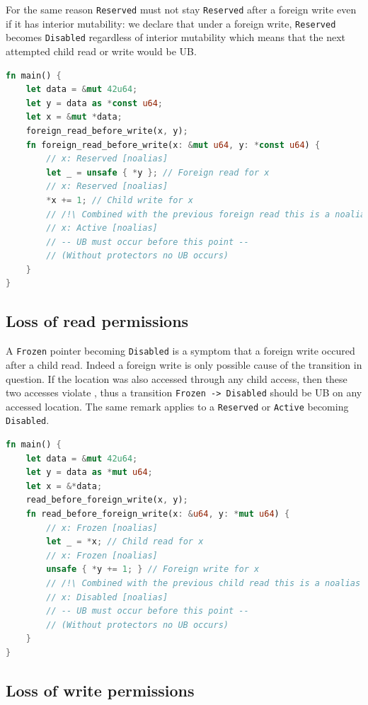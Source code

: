\documentclass[a4paper,11pt]{article}
\theoremstyle{plain}
\theoremstyle{definition}
\theoremstyle{remark}
\newcommand{\tcode}[1]{\rstinline{#1}}
\newcommand{\tperm}[1]{\texttt{#1}}
\begin{document}
For the same reason \tperm{Reserved} must not stay \tperm{Reserved} after a foreign write even
if it has interior mutability: we declare that under a foreign write, \tperm{Reserved} becomes
\tperm{Disabled} regardless of interior mutability which means that the next attempted child read or write would be UB.

\begin{lstlisting}[language=rust]
fn main() {
    let data = &mut 42u64;
    let y = data as *const u64;
    let x = &mut *data;
    foreign_read_before_write(x, y);
    fn foreign_read_before_write(x: &mut u64, y: *const u64) {
        // x: Reserved [noalias]
        let _ = unsafe { *y }; // Foreign read for x
        // x: Reserved [noalias]
        *x += 1; // Child write for x
        // /!\ Combined with the previous foreign read this is a noalias violation
        // x: Active [noalias]
        // -- UB must occur before this point --
        // (Without protectors no UB occurs)
    }
}
\end{lstlisting}


\subsection{Loss of read permissions}

A \tperm{Frozen} pointer becoming \tperm{Disabled} is a symptom that a foreign write occured after
a child read. Indeed a foreign write is only possible cause of the transition in question.
If the location was also accessed through any child access, then these two accesses violate
\tcode{noalias}, thus a transition \tperm{Frozen -> Disabled} should be UB on any accessed location.
The same remark applies to a \tperm{Reserved} or \tperm{Active} becoming \tperm{Disabled}.

\begin{lstlisting}[language=rust]
fn main() {
    let data = &mut 42u64;
    let y = data as *mut u64;
    let x = &*data;
    read_before_foreign_write(x, y);
    fn read_before_foreign_write(x: &u64, y: *mut u64) {
        // x: Frozen [noalias]
        let _ = *x; // Child read for x
        // x: Frozen [noalias]
        unsafe { *y += 1; } // Foreign write for x
        // /!\ Combined with the previous child read this is a noalias violation
        // x: Disabled [noalias]
        // -- UB must occur before this point --
        // (Without protectors no UB occurs)
    }
}
\end{lstlisting}


\subsection{Loss of write permissions}
\end{document}
